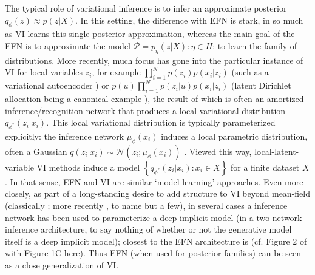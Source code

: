 \documentclass[twoside]{article}
\begin{document}
The typical role of variational inference is to infer an approximate posterior $q_\phi(z) \approx p(z |X)$.  
In this setting, the difference with EFN is stark, in so much as VI learns this single posterior approximation, whereas the main goal of the EFN is to approximate the model $\mathcal{P} = p_\eta(z|X): \eta \in H$: to learn the family of distributions.  
More recently, much focus has gone into the particular instance of VI for local variables $z_i$, for example $\prod_{i=1}^N p(z_i)p(x_i | z_i)$ (such as a variational autoencoder \citep{Kingma:2013aa}) or  $p(u)\prod_{i=1}^N p(z_i|u)p(x_i | z_i)$ (latent Dirichlet allocation being a canonical example \citep{blei2003latent,blei2017variational}), the result of which is often an amortized inference/recognition network that produces a local variational distribution $q_{\phi^*}(z_i | x_i)$.  
This local variational distribution is typically parameterized explicitly: the inference network $\mu_\phi(x_i)$ induces a local parametric distribution, often a Gaussian $q(z_i | x_i) \sim \mathcal{N}\left(z_i; \mu_\phi(x_i)\right)$ \citep[for example]{Kingma:2013aa}.  Viewed this way, local-latent-variable VI methods induce a model $\left\{  q_{\phi^*}(z_i | x_i) : x_i \in X \right\}$ for a finite dataset $X$.   In that sense, EFN and VI are similar `model learning' approaches.
Even more closely, as part of a long-standing desire to add structure to VI beyond mean-field (classically \citep{saul1996exploiting, barber1999tractable}; more recently \citep{hoffman2015stochastic,tran2015copula}, to name but a few), in several cases a inference network has been used to parameterize a deep implicit model (in a two-network inference architecture, to say nothing of whether or not the generative model itself is a deep implicit model); closest to the EFN architecture is \citep{rezende2015variational} (cf. Figure 2 of \citep{rezende2015variational} with Figure 1C here).   Thus EFN (when used for posterior families) can be seen as a close generalization of VI.   
\end{document}
